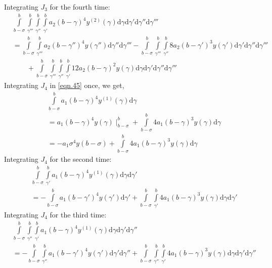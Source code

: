 \documentclass{article}
\begin{document}
Integrating $J_3$ for the fourth time:
\begin{equation}
\begin{split}
	&\int\limits_{b-\sigma}^{b}\int\limits_{\gamma'''}^{b}\int\limits_{\gamma''}^{b}\int\limits_{\gamma'}^{b}a_2(b-\gamma)^{4}y^{(2)}(\gamma)\mathrm{d}\gamma\mathrm{d}\gamma'\mathrm{d}\gamma''\mathrm{d}\gamma'''\\
	&=\int\limits_{b-\sigma}^{b}\int\limits_{\gamma'''}^{b}a_2(b-\gamma'')^{4}y(\gamma'')\mathrm{d}\gamma''\mathrm{d}\gamma''' - \int\limits_{b-\sigma}^{b}\int\limits_{\gamma'''}^{b}\int\limits_{\gamma''}^{b}8a_2(b-\gamma')^{3}y(\gamma')\mathrm{d}\gamma'\mathrm{d}\gamma''\mathrm{d}\gamma'''\\
	&\qquad{} + \int\limits_{b-\sigma}^{b}\int\limits_{\gamma'''}^{b}\int\limits_{\gamma''}^{b}\int\limits_{\gamma'}^{b}12a_2(b-\gamma)^{2}y(\gamma)\mathrm{d}\gamma\mathrm{d}\gamma'\mathrm{d}\gamma''\mathrm{d}\gamma'''
\end{split}
\end{equation}
Integrating $J_4$ in \eqref{eqn.45} once, we get,
\begin{equation}
\begin{split}
	&\int\limits_{b-\sigma}^{b}a_1(b-\gamma)^{4}y^{(1)}(\gamma)\mathrm{d}\gamma \\
	&= a_1(b-\gamma)^{4}y(\gamma)\mid_{b-\sigma}^{b} + \int\limits_{b-\sigma}^{b}4a_1(b-\gamma)^{3}y(\gamma)\mathrm{d}\gamma\\&= -a_1\sigma^{4}y(b-\sigma) + \int\limits_{b-\sigma}^{b}4a_1(b-\gamma)^{3}y(\gamma)\mathrm{d}\gamma	
\end{split}
\end{equation}
Integrating $J_4$ for the second time:
\begin{equation}
\begin{split}
	&\int\limits_{b-\sigma}^{b}\int\limits_{\gamma'}^{b}a_1(b-\gamma)^{4}y^{(1)}(\gamma)\mathrm{d}\gamma\mathrm{d}\gamma'\\
	&=-\int\limits_{b-\sigma}^{b}a_1(b-\gamma')^{4}y(\gamma')\mathrm{d}\gamma' + \int\limits_{b-\sigma}^{b}\int\limits_{\gamma'}^{b}4a_1(b-\gamma)^{3}y(\gamma)\mathrm{d}\gamma\mathrm{d}\gamma'
\end{split}
\end{equation}
Integrating $J_4$ for the third time:
\begin{equation}
\begin{split}
	&\int\limits_{b-\sigma}^{b}\int\limits_{\gamma''}^{b}\int\limits_{\gamma'}^{b}a_1(b-\gamma)^{4}y^{(1)}(\gamma)\mathrm{d}\gamma\mathrm{d}\gamma'\mathrm{d}\gamma''\\
	&=-\int\limits_{b-\sigma}^{b}\int\limits_{\gamma''}^{b}a_1(b-\gamma')^{4}y(\gamma')\mathrm{d}\gamma'\mathrm{d}\gamma'' + \int\limits_{b-\sigma}^{b}\int\limits_{\gamma''}^{b}\int\limits_{\gamma'}^{b}4a_1(b-\gamma)^{3}y(\gamma)\mathrm{d}\gamma\mathrm{d}\gamma'\mathrm{d}\gamma''
\end{split}
\end{equation}
\end{document}
